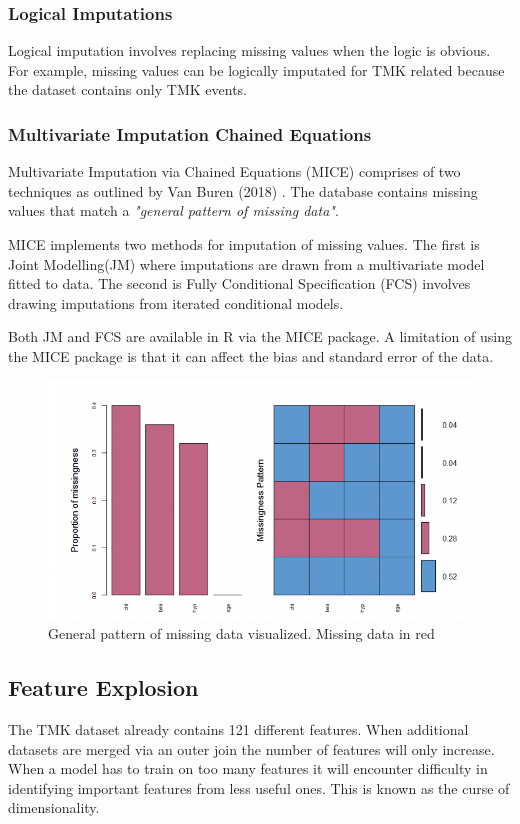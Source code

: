 \subsubsection{Logical Imputations}
Logical imputation involves replacing missing values when the logic is obvious. For example, missing values can be logically imputated for TMK related because the dataset contains only TMK events.

\subsubsection{Multivariate Imputation Chained Equations}
Multivariate Imputation via Chained Equations (MICE) comprises of two techniques as outlined by Van Buren (2018) \cite{vanBuren}. The database contains missing values that match a \emph{"general pattern of missing data"}. 

MICE implements two methods for imputation of missing values. The first is Joint Modelling(JM) where imputations are drawn from a multivariate model fitted to data. The second is Fully Conditional Specification (FCS) involves drawing imputations from iterated conditional models. 

Both JM and FCS are available in R via the MICE package. A limitation of using the MICE package is that it can affect the bias and standard error of the data.

\begin{figure}[h]
\centering
\includegraphics{missingdataimage.png}
\caption{General pattern of missing data visualized. Missing data in red}
\end{figure}


\subsection{Feature Explosion}
The TMK dataset already contains 121 different features. When additional datasets are merged via an outer join the number of features will only increase. When a model has to train on too many features it will encounter difficulty in identifying important features from less useful ones. This is known as the curse of dimensionality. 

